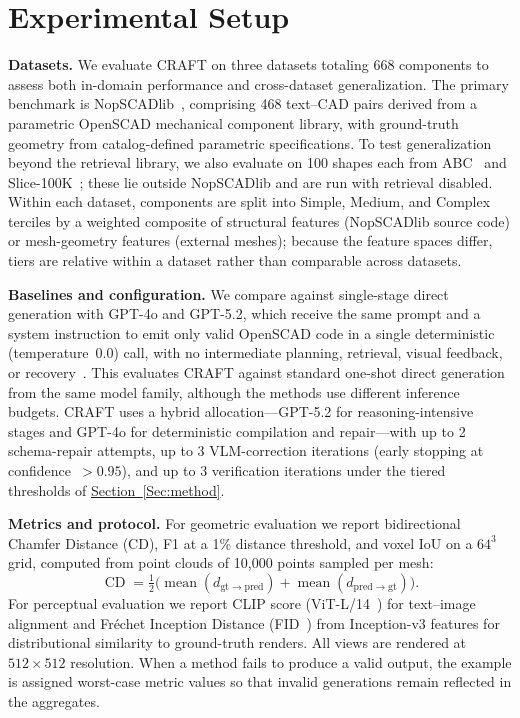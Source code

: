 \documentclass[conference]{IEEEtran}
\newcommand{\colref}[2]{\hyperref[#2]{#1~\ref*{#2}}}
\newcommand{\secref}[1]{\colref{Section}{#1}}
\begin{document}
\section{Experimental Setup}
\label{Sec:setup}

\textbf{Datasets.} We evaluate CRAFT on three datasets totaling 668 components to assess both in-domain performance and cross-dataset generalization. The primary benchmark is NopSCADlib~\citep{nopscadlib}, comprising 468 text--CAD pairs derived from a parametric OpenSCAD mechanical component library, with ground-truth geometry from catalog-defined parametric specifications. To test generalization beyond the retrieval library, we also evaluate on 100 shapes each from ABC~\citep{koch2019abc} and Slice-100K~\citep{slice100k2024}; these lie outside NopSCADlib and are run with retrieval disabled. Within each dataset, components are split into Simple, Medium, and Complex terciles by a weighted composite of structural features (NopSCADlib source code) or mesh-geometry features (external meshes); because the feature spaces differ, tiers are relative within a dataset rather than comparable across datasets.

\textbf{Baselines and configuration.} We compare against single-stage direct generation with GPT-4o and GPT-5.2, which receive the same prompt and a system instruction to emit only valid OpenSCAD code in a single deterministic (temperature~$0.0$) call, with no intermediate planning, retrieval, visual feedback, or recovery~\citep{openai2023gpt4}. This evaluates CRAFT against standard one-shot direct generation from the same model family, although the methods use different inference budgets. CRAFT uses a hybrid allocation---GPT-5.2 for reasoning-intensive stages and GPT-4o for deterministic compilation and repair---with up to 2 schema-repair attempts, up to 3 VLM-correction iterations (early stopping at confidence~$>0.95$), and up to 3 verification iterations under the tiered thresholds of \secref{Sec:method}.

\textbf{Metrics and protocol.} For geometric evaluation we report bidirectional Chamfer Distance (CD), F1 at a 1\% distance threshold, and voxel IoU on a $64^3$ grid, computed from point clouds of 10{,}000 points sampled per mesh:
\begin{equation}
\operatorname{CD}=\tfrac{1}{2}\bigl(\operatorname{mean}(d_{\mathrm{gt}\to\mathrm{pred}})+\operatorname{mean}(d_{\mathrm{pred}\to\mathrm{gt}})\bigr).
\end{equation}
For perceptual evaluation we report CLIP score (ViT-L/14~\citep{radford2021clip}) for text--image alignment and Fr\'echet Inception Distance (FID~\citep{heusel2017fid}) from Inception-v3 features for distributional similarity to ground-truth renders. All views are rendered at $512\times512$ resolution. When a method fails to produce a valid output, the example is assigned worst-case metric values so that invalid generations remain reflected in the aggregates.
\end{document}
